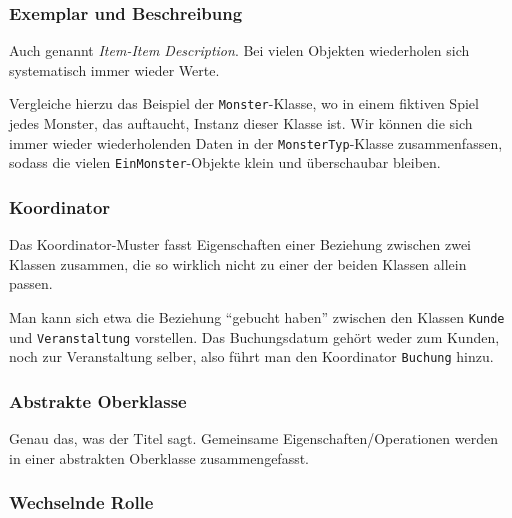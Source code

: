 \documentclass[german]{panikzettel}
\begin{document}
\subsubsection{Exemplar und Beschreibung}

Auch genannt \emph{Item-Item Description}.
Bei vielen Objekten wiederholen sich systematisch immer wieder Werte.

Vergleiche hierzu das Beispiel der \lstinline{Monster}-Klasse, wo in einem fiktiven Spiel jedes Monster, das auftaucht, Instanz dieser Klasse ist.
Wir können die sich immer wieder wiederholenden Daten in der \lstinline{MonsterTyp}-Klasse zusammenfassen, sodass die vielen \lstinline{EinMonster}-Objekte klein und überschaubar bleiben.


\subsubsection{Koordinator}

Das Koordinator-Muster fasst Eigenschaften einer Beziehung zwischen zwei Klassen zusammen, die so wirklich nicht zu einer der beiden Klassen allein passen.

Man kann sich etwa die Beziehung ``gebucht haben'' zwischen den Klassen \lstinline{Kunde} und \lstinline{Veranstaltung} vorstellen.
Das Buchungsdatum gehört weder zum Kunden, noch zur Veranstaltung selber, also führt man den Koordinator \lstinline{Buchung} hinzu.

\subsubsection{Abstrakte Oberklasse}

Genau das, was der Titel sagt.
Gemeinsame Eigenschaften/Operationen werden in einer abstrakten Oberklasse zusammengefasst.

\subsubsection{Wechselnde Rolle}
\end{document}
